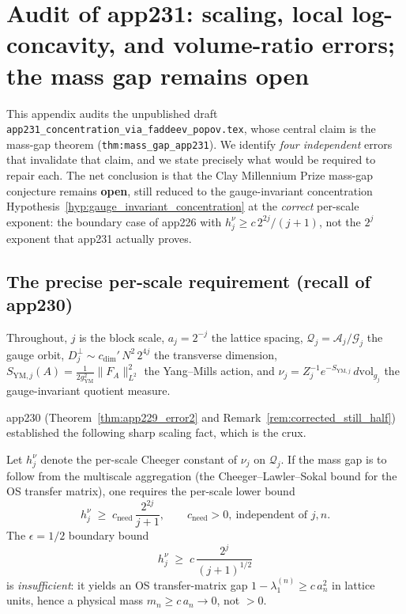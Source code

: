 
\section{Audit of app231: scaling, local log-concavity, and volume-ratio
errors; the mass gap remains open}
\label{app:audit_app231_scaling}

This appendix audits the unpublished draft
\texttt{app231\_concentration\_via\_faddeev\_popov.tex}, whose central
claim is the mass-gap theorem (\texttt{thm:mass\_gap\_app231}). We
identify \emph{four independent} errors that invalidate that claim, and
we state precisely what would be required to repair each. The net
conclusion is that the Clay Millennium Prize mass-gap conjecture remains
\textbf{open}, still reduced to the gauge-invariant concentration
Hypothesis~\ref{hyp:gauge_invariant_concentration} at the \emph{correct}
per-scale exponent: the boundary case of app226 with
$h_{j}^{\nu}\ge c\,2^{2j}/(j+1)$, not the $2^{j}$ exponent that
app231 actually proves.

\subsection{The precise per-scale requirement (recall of app230)}

Throughout, $j$ is the block scale, $a_{j}=2^{-j}$ the lattice spacing,
$\mathcal{Q}_{j}=\mathcal{A}_{j}/\mathcal{G}_{j}$ the gauge orbit,
$D_{j}^{\perp}\sim c_{\dim}'\,N^{2}\,2^{4j}$ the transverse dimension,
$S_{\mathrm{YM},j}(A)=\tfrac{1}{2g_{\mathrm{YM}}^{2}}\|F_{A}\|_{L^{2}}^{2}$
the Yang--Mills action, and
$\nu_{j}=Z_{j}^{-1}e^{-S_{\mathrm{YM},j}}\,d\mathrm{vol}_{g_{j}}$ the
gauge-invariant quotient measure.

app230 (Theorem~\ref{thm:app229_error2} and
Remark~\ref{rem:corrected_still_half}) established the following sharp
scaling fact, which is the crux.

\begin{theorem}
\label{thm:per_scale_exponent_needed}
Let $h_{j}^{\nu}$ denote the per-scale Cheeger constant of $\nu_{j}$ on
$\mathcal{Q}_{j}$. If the mass gap is to follow from the multiscale
aggregation (the Cheeger--Lawler--Sokal bound for the OS transfer
matrix), one requires the per-scale lower bound
\begin{equation}
\label{eq:needed_per_scale}
  h_{j}^{\nu}\;\ge\;c_{\mathrm{need}}\,\frac{2^{2j}}{j+1},
  \qquad c_{\mathrm{need}}>0,\ \text{independent of }j,n.
\end{equation}
The $\epsilon=1/2$ boundary bound
\begin{equation}
\label{eq:insufficient_per_scale}
  h_{j}^{\nu}\;\ge\;c\,\frac{2^{j}}{(j+1)^{1/2}}
\end{equation}
is \emph{insufficient}: it yields an OS transfer-matrix gap
$1-\lambda_{1}^{(n)}\ge c\,a_{n}^{2}$ in lattice units, hence a
physical mass $m_{n}\ge c\,a_{n}\to 0$, not $>0$.
\end{theorem}

